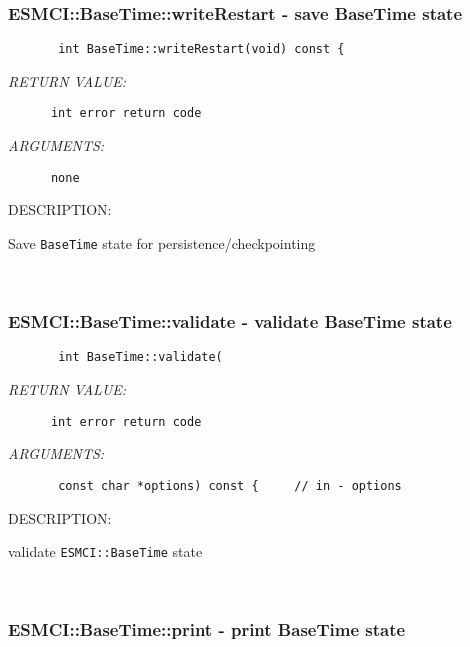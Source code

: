 \subsubsection [ESMCI::BaseTime::writeRestart] {ESMCI::BaseTime::writeRestart - save BaseTime state}


  
\begin{verbatim}       int BaseTime::writeRestart(void) const {\end{verbatim}{\em RETURN VALUE:}
\begin{verbatim}      int error return code\end{verbatim}{\em ARGUMENTS:}
\begin{verbatim}      none\end{verbatim}
{\sf DESCRIPTION:\\ }


        Save {\tt BaseTime} state for persistence/checkpointing
   
 
\mbox{}\hrulefill\ 
 
\subsubsection [ESMCI::BaseTime::validate] {ESMCI::BaseTime::validate - validate BaseTime state}


  
\begin{verbatim}       int BaseTime::validate(\end{verbatim}{\em RETURN VALUE:}
\begin{verbatim}      int error return code\end{verbatim}{\em ARGUMENTS:}
\begin{verbatim}       const char *options) const {     // in - options\end{verbatim}
{\sf DESCRIPTION:\\ }


        validate {\tt ESMCI::BaseTime} state
   
 
\mbox{}\hrulefill\ 
 
\subsubsection [ESMCI::BaseTime::print] {ESMCI::BaseTime::print - print BaseTime state}


